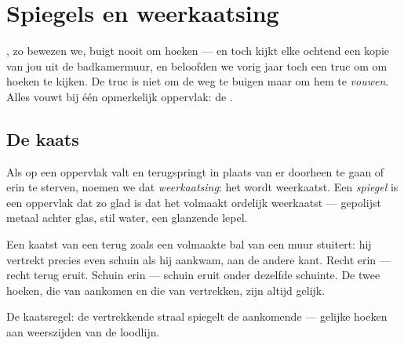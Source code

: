 \chapter{Spiegels en weerkaatsing}\label{ch:g5:mirrors-reflection}

, zo bewezen we, buigt nooit om hoeken --- en toch kijkt elke
ochtend een kopie van jou uit de badkamermuur, en beloofden we vorig
jaar toch een truc om om hoeken te kijken. De truc is niet om de weg te
buigen maar om hem te \emph{vouwen}. Alles vouwt bij één opmerkelijk
oppervlak: de .

\section{De kaats}

\begin{definition}[Weerkaatsing]\label{def:g5:mirrors-reflection:reflection}
Als  op een oppervlak valt en terugspringt in plaats van er
doorheen te gaan of erin te sterven, noemen we dat
\emph{weerkaatsing}: het  wordt weerkaatst.
Een \emph{spiegel} is een oppervlak dat zo glad is dat
het  volmaakt ordelijk weerkaatst --- gepolijst metaal achter
glas, stil water, een glanzende lepel.
\end{definition}

\begin{proposition}[De kaatsregel]\label{prop:g5:mirrors-reflection:bounce}
Een  kaatst van een  terug zoals een volmaakte bal
van een muur stuitert: hij vertrekt precies even schuin als hij
aankwam, aan de andere kant. Recht erin --- recht terug eruit. Schuin
erin --- schuin eruit onder dezelfde schuinte. De twee hoeken, die van
aankomen en die van vertrekken, zijn altijd gelijk.
\end{proposition}

\begin{omfigure}

{\small De kaatsregel: de vertrekkende straal spiegelt de aankomende
--- gelijke hoeken aan weerszijden van de loodlijn.}
\end{omfigure}


